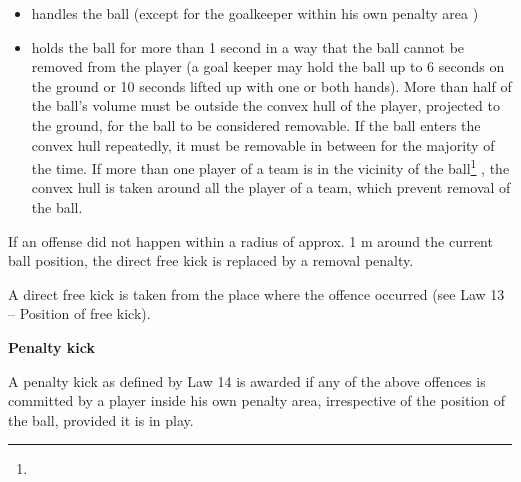 \begin{itemize}
\item handles the ball (except for the goalkeeper within his own penalty area )
\item {}holds the ball for more than 1 second in a way that the
  ball cannot be removed from the player (a goal keeper may hold the ball up to
  6 seconds on the ground or 10 seconds lifted up with one or both hands). More than half of the ball's volume must be outside
  the convex hull of the player, projected to the ground, for the ball to be
  considered removable. If the ball enters the convex hull repeatedly, it must
  be removable in between for the majority of the time. If more than one player
  of a team is in the vicinity of the ball\footnote{
  }
  , the convex hull is taken around all
  the player of a team, which prevent removal of the ball.
\end{itemize}

\bigskip

If an offense did not happen within a radius of approx. 1 m
around the current ball position, the direct free kick is replaced by a removal
penalty.


\bigskip


A direct free kick is taken from the place where the offence occurred (see Law 13 -- Position of free kick). 



\bigskip

{\bfseries Penalty kick}

\headlinebox

A penalty kick as defined by Law 14 is awarded if any of the above 
offences is committed by a player inside his own penalty area,
irrespective of the position of the ball, provided it is in play.


\bigskip

